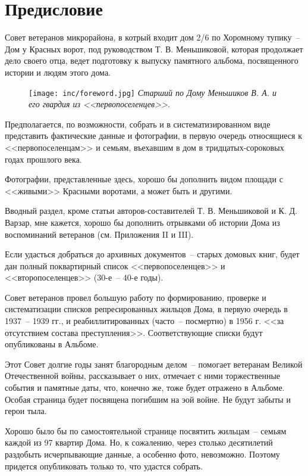 \chapter{Предисловие}

\noindent
Совет ветеранов микрорайона, в котрый входит дом 2/6 по Хоромному тупику~-- Дом у Красных ворот, под руководством Т. В. Меньшиковой, которая продолжает дело своего отца, ведет подготовку к выпуску памятного альбома, посвященного истории и людям этого дома.


\begin{figure}[ht]
  \centering
  \begin{minipage}{7cm}
  \texttt{[image: inc/foreword.jpg]}
  \textit{\footnotesize{ Старший по Дому Меньшиков В. А. и его гвардия из <<первопоселенцев>>.}}
  \end{minipage}
\end{figure}

Предполагается, по возможности, собрать и в систематизированном виде представить фактические данные и фотографии, в первую очередь относящиеся к <<первопоселенцам>> и семьям, въехавшим в дом в тридцатых-сороковых годах прошлого века.

Фотографии, представленные здесь, хорошо бы дополнить видом площади с <<живыми>> Красными воротами, а может быть и другими.

Вводный раздел, кроме статьи авторов-составителей Т. В. Меньшиковой и К. Д. Варзар, мне кажется, хорошо бы дополнить отрывками об истории Дома из воспоминаний ветеранов (см. Приложения II и III).

Если удасться добраться до архивных документов~-- старых домовых книг, будет дан полный поквартирный список <<первопоселенцев>> и <<второпоселенцев>> (30-е~-- 40-е годы).

Совет ветеранов провел большую работу по формированию, проверке и систематизации списков репресированных жильцов Дома, в первую очередь в 1937~-- 1939 гг., и реабиллитированных (часто~-- посмертно) в 1956 г. <<за отсутствием состава преступления>>. Соответствующие списки будут опубликованы в Альбоме.

Этот Совет долгие годы занят благородным делом~-- помогает ветеранам Великой Отечественной войны, рассказывает о них, отмечает с ними торжественные события и памятные даты, что, конечно же, тоже будет отражено в Альбоме. Особая страница будет посвящена погибшим на эой войне. Не будут забыты и герои тыла.

Хорошо было бы по самостоятельной странице посвятить жильцам~-- семьям каждой из 97 квартир Дома. Но, к сожалению, через столько десятилетий раздобыть исчерпывающие данные, а особенно фото, невозможно.
Поэтому придется опубликовать только то, что удастся собрать. 

